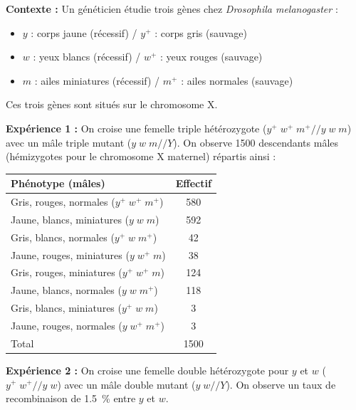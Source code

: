 \documentclass[11pt]{article}
\begin{document}
\begin{exercice}
\textbf{Contexte :} Un généticien étudie trois gènes chez \emph{Drosophila melanogaster} :
\begin{itemize}
    \item $y$ : corps jaune (récessif) / $y^+$ : corps gris (sauvage)
    \item $w$ : yeux blancs (récessif) / $w^+$ : yeux rouges (sauvage)
    \item $m$ : ailes miniatures (récessif) / $m^+$ : ailes normales (sauvage)
\end{itemize}
Ces trois gènes sont situés sur le chromosome X.

\textbf{Expérience 1 :} On croise une femelle triple hétérozygote ($y^+\;w^+\;m^+ // y\;w\;m$) avec un mâle triple mutant ($y\;w\;m // Y$). On observe 1500 descendants mâles (hémizygotes pour le chromosome X maternel) répartis ainsi :
\begin{center}
\begin{tabular}{|l|c|}\hline
\rowcolor{popblueL} Phénotype (mâles) & Effectif \\ \hline
Gris, rouges, normales ($y^+\;w^+\;m^+$) & 580 \\
Jaune, blancs, miniatures ($y\;w\;m$) & 592 \\
Gris, blancs, normales ($y^+\;w\;m^+$) & 42 \\
Jaune, rouges, miniatures ($y\;w^+\;m$) & 38 \\
Gris, rouges, miniatures ($y^+\;w^+\;m$) & 124 \\
Jaune, blancs, normales ($y\;w\;m^+$) & 118 \\
Gris, blancs, miniatures ($y^+\;w\;m$) & 3 \\
Jaune, rouges, normales ($y\;w^+\;m^+$) & 3 \\ \hline
Total & 1500 \\ \hline
\end{tabular}
\end{center}

\textbf{Expérience 2 :} On croise une femelle double hétérozygote pour $y$ et $w$ ($y^+\;w^+ // y\;w$) avec un mâle double mutant ($y\;w // Y$). On observe un taux de recombinaison de \SI{1,5}{\percent} entre $y$ et $w$.


\end{exercice}
\end{document}
